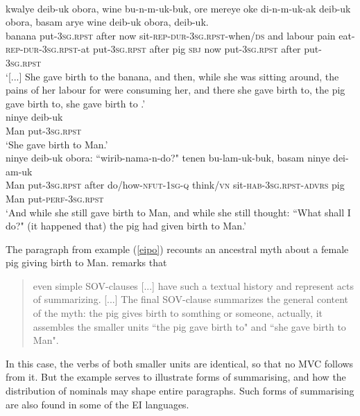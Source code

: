 \ea \label{eipo}
\\
\ea
\gll kwalye deib-uk obora, wine bu-n-m-uk-buk, ore  mereye oke di-n-m-uk-ak deib-uk obora, basam arye wine deib-uk obora,  deib-uk. \\
banana put-3\textsc{sg}.\textsc{rpst} after now sit-\textsc{rep}-\textsc{dur}-3\textsc{sg}.\textsc{rpst}-when/\textsc{ds} and  labour pain eat-\textsc{rep}-\textsc{dur}-3\textsc{sg}.\textsc{rpst}-at put-3\textsc{sg}.\textsc{rpst} after pig \textsc{sbj} now put-3\textsc{sg}.\textsc{rpst} after  put-3\textsc{sg}.\textsc{rpst} \\
\glft `[...] She gave birth to the banana, and then, while she was sitting around, the pains of her labour for  were consuming her, and there she gave birth to, the pig gave birth to, she gave birth to .' \\
\ex
\gll ninye deib-uk \\
Man put-3\textsc{sg}.\textsc{rpst} \\
\glft `She gave birth to Man.' \\
\ex
\gll ninye deib-uk obora: ``wirib-nama-n-do?" tenen bu-lam-uk-buk, basam ninye dei-am-uk \\
Man put-3\textsc{sg}.\textsc{rpst} after do/how-\textsc{nfut}-1\textsc{sg}-\textsc{q} think/\textsc{vn} sit-\textsc{hab}-3\textsc{sg}.\textsc{rpst}-\textsc{advrs} pig Man put-\textsc{perf}-3\textsc{sg}.\textsc{rpst} \\
\glft `And while she still gave birth to Man, and while she still thought: ``What shall I do?" (it happened that) the pig had given birth to Man.'\\
\z
\z

The paragraph from example (\ref{eipo}) recounts an ancestral myth about a female pig giving birth to Man. \citet[308]{heeschen1998eipo} remarks that

\begin{quote}even simple SOV-clauses [...] have such a textual history and represent acts of summarizing. [...] The final SOV-clause summarizes the general content of the myth: the pig gives birth to somthing or someone, actually, it assembles the smaller units ``the pig gave birth to" and ``she gave birth to Man".\end{quote}

In this case, the verbs of both smaller units are identical, so that no MVC follows from it. But the example serves to illustrate  forms of summarising, and how the distribution of nominals may shape entire paragraphs. Such forms of summarising are also found in some of the EI languages.

